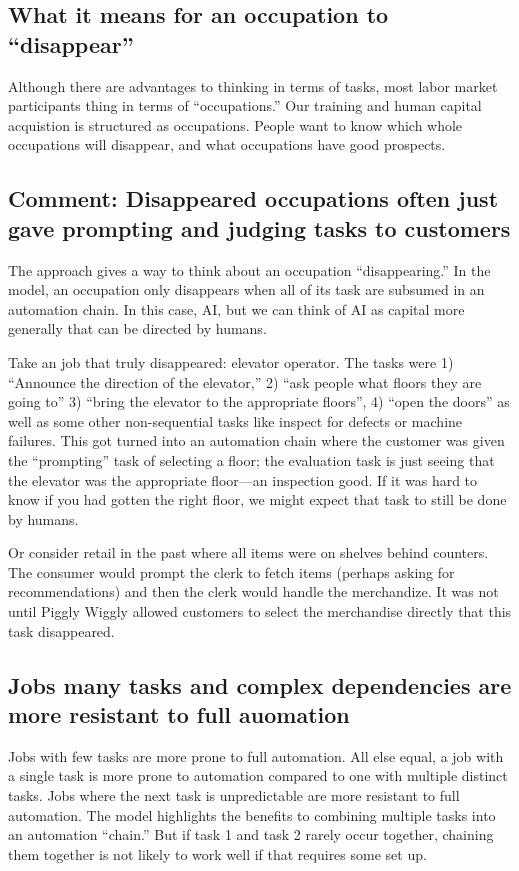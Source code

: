 \documentclass{article}
\begin{document}
\subsection{What it means for an occupation to ``disappear''}
Although there are advantages to thinking in terms of tasks, most labor market participants thing in terms of ``occupations.'' 
Our training and human capital acquistion is structured as occupations.
People want to know which whole occupations will disappear, and what occupations have good prospects. 

\begin{tcolorbox}
\subsection{Comment: Disappeared occupations often just gave prompting and judging tasks to customers}
The approach gives a way to think about an occupation ``disappearing.''
In the model, an occupation only disappears when all of its task are subsumed in an automation chain.
In this case, AI, but we can think of AI as capital more generally that can be directed by humans. 

Take an job that truly disappeared: elevator operator. 
The tasks were 1) ``Announce the direction of the elevator,'' 2) ``ask people what floors they are going to'' 3) ``bring the elevator to the appropriate floors'', 4) ``open the doors'' as well as some other non-sequential tasks like inspect for defects or machine failures.  
This got turned into an automation chain where the customer was given the ``prompting'' task of selecting a floor; the evaluation task is just seeing that the elevator was the appropriate floor---an inspection good.
If it was hard to know if you had gotten the right floor, we might expect that task to still be done by humans.

Or consider retail in the past where all items were on shelves behind counters. 
The consumer would prompt the clerk to fetch items (perhaps asking for recommendations) and then the clerk would handle the merchandize. 
It was not until Piggly Wiggly allowed customers to select the merchandise directly that this task disappeared. 
\end{tcolorbox}

\begin{tcolorbox}
\subsection{Jobs many tasks and complex dependencies are more resistant to full auomation}
Jobs with few tasks are more prone to full automation.
All else equal, a job with a single task is more prone to automation compared to one with multiple distinct tasks.
Jobs where the next task is unpredictable are more resistant to full automation.
The model highlights the benefits to combining multiple tasks into an automation ``chain.''
But if task 1 and task 2 rarely occur together, chaining them together is not likely to work well if that requires some set up.
\end{tcolorbox}
\end{document}
